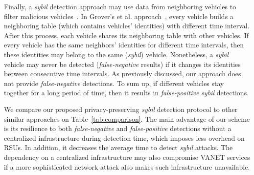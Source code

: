 \documentclass[preprint,12pt]{elsarticle}
\begin{document}

Finally, a \textit{sybil} detection approach may use data from neighboring vehicles to filter malicious vehicles~\cite{sybil-neighborhood1, sybil-neighborhood3}. In Grover's et al. approach~\cite{sybil-neighborhood2}, every vehicle builds a neighboring table (which contains vehicles' identities) with different time interval. After this process, each vehicle shares its neighboring table with other vehicles. If every vehicle has the same neighbors' identities for different time intervals, then these identities may belong to the same (\textit{sybil}) vehicle. Nonetheless, a \textit{sybil} vehicle may never be detected (\textit{false-negative} results) if it changes its identities between consecutive time intervals. As previously discussed, our approach does not provide \textit{false-negative} detections. To sum up, if different vehicles stay together for a long period of time, then it results in \textit{false-positive} \textit{sybil} detections.

We compare our proposed privacy-preserving \textit{sybil} detection protocol to other similar approaches on Table~\ref{tab:comparison}. The main advantage of our scheme is its resilience to both \textit{false-negative} and \textit{false-positive} detections without a centralized infrastructure during detection time, which imposes less overhead on RSUs. In addition, it decreases the average time to detect \textit{sybil} attacks. The dependency on a centralized infrastructure may also compromise VANET services if a more sophisticated network attack also makes such infrastructure unavailable.
\end{document}
